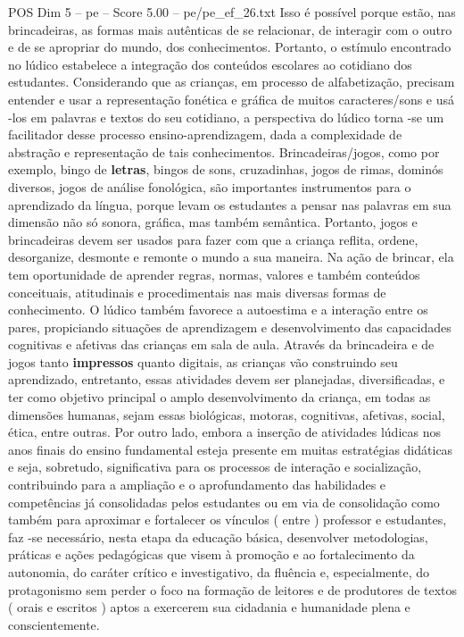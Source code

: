 \begin{textsample}{POS Dim 5 – pe – Score 5.00 – pe/pe\_ef\_26.txt}
Isso é possível porque estão, nas brincadeiras, as formas mais autênticas de se relacionar, de interagir com o outro e de se apropriar do mundo, dos conhecimentos.
Portanto, o estímulo encontrado no lúdico estabelece a integração dos conteúdos escolares ao cotidiano dos estudantes.
Considerando que as crianças, em processo de alfabetização, precisam entender e usar a representação fonética e gráfica de muitos caracteres/sons e usá -los em palavras e textos do seu cotidiano, a perspectiva do lúdico torna -se um facilitador desse processo ensino-aprendizagem, dada a complexidade de abstração e representação de tais conhecimentos.
Brincadeiras/jogos, como por exemplo, bingo de \textbf{letras}, bingos de sons, cruzadinhas, jogos de rimas, dominós diversos, jogos de análise fonológica, são importantes instrumentos para o aprendizado da língua, porque levam os estudantes a pensar nas palavras em sua dimensão não só sonora, gráfica, mas também semântica.
Portanto, jogos e brincadeiras devem ser usados para fazer com que a criança reflita, ordene, desorganize, desmonte e remonte o mundo a sua maneira.
Na ação de brincar, ela tem oportunidade de aprender regras, normas, valores e também conteúdos conceituais, atitudinais e procedimentais nas mais diversas formas de conhecimento.
O lúdico também favorece a autoestima e a interação entre os pares, propiciando situações de aprendizagem e desenvolvimento das capacidades cognitivas e afetivas das crianças em sala de aula.
Através da brincadeira e de jogos tanto \textbf{impressos} quanto digitais, as crianças vão construindo seu aprendizado, entretanto, essas atividades devem ser planejadas, diversificadas, e ter como objetivo principal o amplo desenvolvimento da criança, em todas as dimensões humanas, sejam essas biológicas, motoras, cognitivas, afetivas, social, ética, entre outras.
Por outro lado, embora a inserção de atividades lúdicas nos anos finais do ensino fundamental esteja presente em muitas estratégias didáticas e seja, sobretudo, significativa para os processos de interação e socialização, contribuindo para a ampliação e o aprofundamento das habilidades e competências já consolidadas pelos estudantes ou em via de consolidação como também para aproximar e fortalecer os vínculos ( entre ) professor e estudantes, faz -se necessário, nesta etapa da educação básica, desenvolver metodologias, práticas e ações pedagógicas que visem à promoção e ao fortalecimento da autonomia, do caráter crítico e investigativo, da fluência e, especialmente, do protagonismo sem perder o foco na formação de leitores e de produtores de textos ( orais e escritos ) aptos a exercerem sua cidadania e humanidade plena e conscientemente.

\end{textsample}
